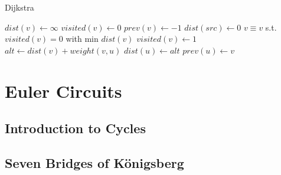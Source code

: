 \documentclass[11pt]{article}
\begin{document}
\begin{algorithm}[H]
\caption{Dijkstra}
\begin{algorithmic}
	\State $dist(v) \gets \infty$
	\State $visited(v) \gets 0$
    \State $prev(v) \gets -1$
\EndFor
\State $dist(src) \gets 0$
	\State $v \equiv v$ s.t. $visited(v)=0$ with min $dist(v)$
    \State $visited(v) \gets 1$
    		\State $alt \gets dist(v) + weight(v, u)$
				\State $dist(u) \gets alt$
   	        	\State $prev(u) \gets v$
			\EndIf
        \EndIf
    \EndFor
\EndWhile
\end{algorithmic}
\end{algorithm}

\section{Euler Circuits}

\subsection{Introduction to Cycles}

\subsection{Seven Bridges of K\"{o}nigsberg}
\end{document}
